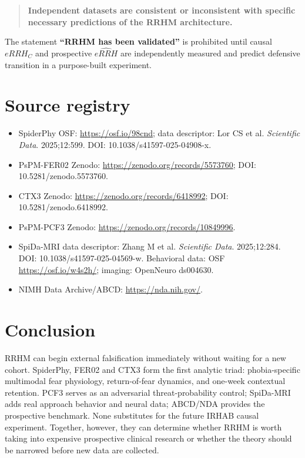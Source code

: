 \documentclass[11pt]{article}
\begin{document}
\begin{quote}
\textbf{Independent datasets are consistent or inconsistent with specific necessary predictions of the RRHM architecture.}
\end{quote}

The statement \textbf{``RRHM has been validated''} is prohibited until causal $eRRH_C$ and prospective $\widehat{eRRH}$ are independently measured and predict defensive transition in a purpose-built experiment.

\section{Source registry}

\begin{itemize}[leftmargin=2em]
\item SpiderPhy OSF: \url{https://osf.io/98cnd}; data descriptor: Lor CS et al. \textit{Scientific Data}. 2025;12:599. DOI: 10.1038/s41597-025-04908-x.
\item PsPM-FER02 Zenodo: \url{https://zenodo.org/records/5573760}; DOI: 10.5281/zenodo.5573760.
\item CTX3 Zenodo: \url{https://zenodo.org/records/6418992}; DOI: 10.5281/zenodo.6418992.
\item PsPM-PCF3 Zenodo: \url{https://zenodo.org/records/10849996}.
\item SpiDa-MRI data descriptor: Zhang M et al. \textit{Scientific Data}. 2025;12:284. DOI: 10.1038/s41597-025-04569-w. Behavioral data: OSF \url{https://osf.io/w4s2h/}; imaging: OpenNeuro ds004630.
\item NIMH Data Archive/ABCD: \url{https://nda.nih.gov/}.
\end{itemize}

\section*{Conclusion}

RRHM can begin external falsification immediately without waiting for a new cohort. SpiderPhy, FER02 and CTX3 form the first analytic triad: phobia-specific multimodal fear physiology, return-of-fear dynamics, and one-week contextual retention. PCF3 serves as an adversarial threat-probability control; SpiDa-MRI adds real approach behavior and neural data; ABCD/NDA provides the prospective benchmark. None substitutes for the future IRHAB causal experiment. Together, however, they can determine whether RRHM is worth taking into expensive prospective clinical research or whether the theory should be narrowed before new data are collected.
\end{document}
